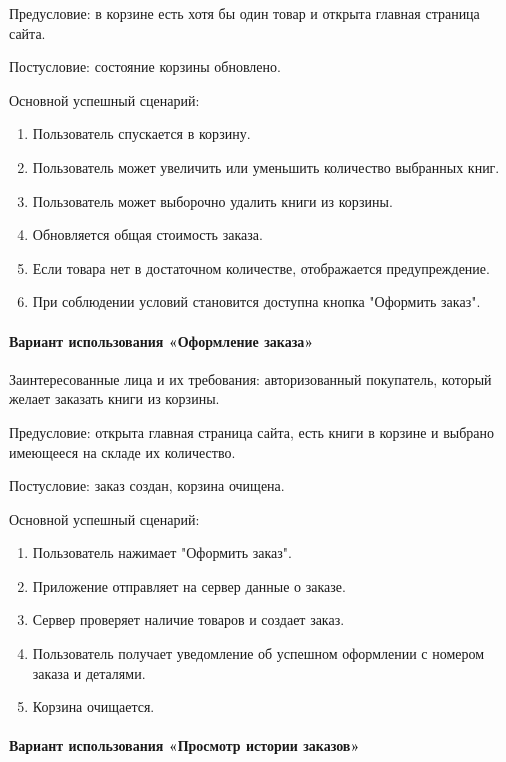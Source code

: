 Предусловие: в корзине есть хотя бы один товар и открыта главная страница сайта.

Постусловие: состояние корзины обновлено.

Основной успешный сценарий:

\begin{enumerate}
	\item Пользователь спускается в корзину.
	\item Пользователь может увеличить или уменьшить количество выбранных книг.
	\item Пользователь может выборочно удалить книги из корзины.
	\item Обновляется общая стоимость заказа.
	\item Если товара нет в достаточном количестве, отображается предупреждение.
	\item При соблюдении условий становится доступна кнопка "Оформить заказ".
\end{enumerate}


\paragraph{Вариант использования «Оформление заказа»}

Заинтересованные лица и их требования: авторизованный покупатель, который желает заказать книги из корзины.

Предусловие: открыта главная страница сайта, есть книги в корзине и выбрано имеющееся на складе их количество.

Постусловие: заказ создан, корзина очищена.

Основной успешный сценарий:

\begin{enumerate}
	\item Пользователь нажимает "Оформить заказ".
	\item Приложение отправляет на сервер данные о заказе.
	\item Сервер проверяет наличие товаров и создает заказ.
	\item Пользователь получает уведомление об успешном оформлении с номером заказа и деталями.
	\item Корзина очищается.
\end{enumerate}


\paragraph{Вариант использования «Просмотр истории заказов»}

